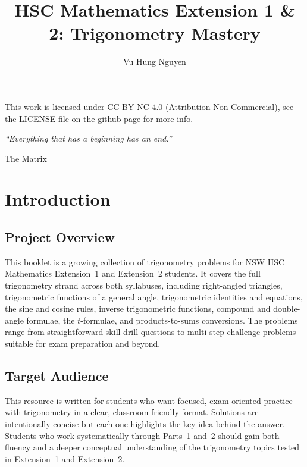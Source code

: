 \documentclass[12pt]{article}
\author{Vu Hung Nguyen}
\title{HSC Mathematics Extension 1 \& 2: Trigonometry Mastery}
\date{}
\begin{document}


\newpage



\begingroup\small\noindent This work is licensed under CC BY-NC 4.0 (Attribution-Non-Commercial), see the LICENSE file on the github page for more info.\par\endgroup

\newpage

\thispagestyle{empty}
\vspace*{\fill}
\begin{center}
\itshape
``Everything that has a beginning has an end.''

\vspace{1em}
\normalfont The Matrix
\end{center}
\vspace*{\fill}

\newpage

\tableofcontents
\newpage

\section{Introduction}

\subsection{Project Overview}
This booklet is a growing collection of trigonometry problems for NSW HSC Mathematics Extension~1 and Extension~2 students. It covers the full trigonometry strand across both syllabuses, including right-angled triangles, trigonometric functions of a general angle, trigonometric identities and equations, the sine and cosine rules, inverse trigonometric functions, compound and double-angle formulae, the $t$-formulae, and products-to-sums conversions. The problems range from straightforward skill-drill questions to multi-step challenge problems suitable for exam preparation and beyond.

\subsection{Target Audience}
This resource is written for students who want focused, exam-oriented practice with trigonometry in a clear, classroom-friendly format. Solutions are intentionally concise but each one highlights the key idea behind the answer. Students who work systematically through Parts~1 and~2 should gain both fluency and a deeper conceptual understanding of the trigonometry topics tested in Extension~1 and Extension~2.
\end{document}
